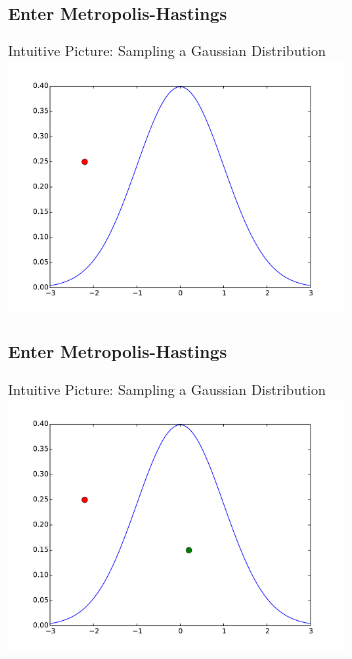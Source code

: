 \documentclass[mathserif]{beamer}
\begin{document}
\begin{frame}
\frametitle{Enter Metropolis-Hastings}

\begin{block}{Intuitive Picture: Sampling a Gaussian Distribution}
  \includegraphics[width=3.5in]{figs/norm.pdf}
\end{block}

\end{frame}

\begin{frame}
\frametitle{Enter Metropolis-Hastings}

\begin{block}{Intuitive Picture: Sampling a Gaussian Distribution}
  \includegraphics[width=3.5in]{figs/norm-acc.pdf}
\end{block}

\end{frame}
\end{document}
